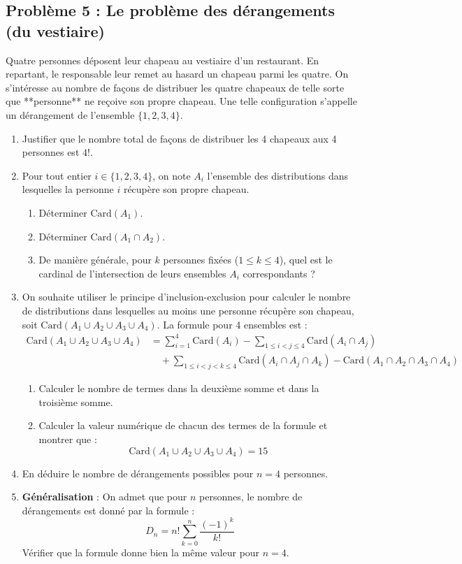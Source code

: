\subsection*{Problème 5 : Le problème des dérangements (du vestiaire)}
Quatre personnes déposent leur chapeau au vestiaire d'un restaurant. En repartant, le responsable leur remet au hasard un chapeau parmi les quatre.
On s'intéresse au nombre de façons de distribuer les quatre chapeaux de telle sorte que **personne** ne reçoive son propre chapeau. Une telle configuration s'appelle un dérangement de l'ensemble $\{1, 2, 3, 4\}$.
\begin{enumerate}
    \item Justifier que le nombre total de façons de distribuer les 4 chapeaux aux 4 personnes est $4!$.
    \item Pour tout entier $i \in \{1, 2, 3, 4\}$, on note $A_i$ l'ensemble des distributions dans lesquelles la personne $i$ récupère son propre chapeau.
    \begin{enumerate}
        \item Déterminer $\text{Card}(A_1)$.
        \item Déterminer $\text{Card}(A_1 \cap A_2)$.
        \item De manière générale, pour $k$ personnes fixées ($1 \le k \le 4$), quel est le cardinal de l'intersection de leurs ensembles $A_i$ correspondants ?
    \end{enumerate}
    \item On souhaite utiliser le principe d'inclusion-exclusion pour calculer le nombre de distributions dans lesquelles au moins une personne récupère son chapeau, soit $\text{Card}(A_1 \cup A_2 \cup A_3 \cup A_4)$. La formule pour 4 ensembles est :
    \[
    \begin{aligned}
    \text{Card}(A_1 \cup A_2 \cup A_3 \cup A_4) &= \sum_{i=1}^4 \text{Card}(A_i) - \sum_{1 \le i < j \le 4} \text{Card}(A_i \cap A_j) \\
    &\quad + \sum_{1 \le i < j < k \le 4} \text{Card}(A_i \cap A_j \cap A_k) - \text{Card}(A_1 \cap A_2 \cap A_3 \cap A_4)
    \end{aligned}
    \]
    \begin{enumerate}
        \item Calculer le nombre de termes dans la deuxième somme et dans la troisième somme.
        \item Calculer la valeur numérique de chacun des termes de la formule et montrer que :
        \[
        \text{Card}(A_1 \cup A_2 \cup A_3 \cup A_4) = 15
        \]
    \end{enumerate}
    \item En déduire le nombre de dérangements possibles pour $n=4$ personnes.
    \item \textbf{Généralisation} : On admet que pour $n$ personnes, le nombre de dérangements est donné par la formule :
    \[
    D_n = n! \sum_{k=0}^n \frac{(-1)^k}{k!}
    \]
    Vérifier que la formule donne bien la même valeur pour $n=4$.
\end{enumerate}

